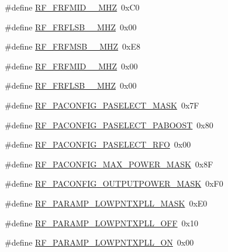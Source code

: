 \begin{DoxyCompactItemize}
\item 
\#define \mbox{\hyperlink{sx1276_regs-_fsk_8h_a5f486d2c3784ae62187f57030d347b17}{R\+F\+\_\+\+F\+R\+F\+M\+I\+D\+\_\+\_\+\+M\+HZ}}~0x\+C0
\item 
\#define \mbox{\hyperlink{sx1276_regs-_fsk_8h_aafaad9f6003901f9081b92d207c67022}{R\+F\+\_\+\+F\+R\+F\+L\+S\+B\+\_\+\_\+\+M\+HZ}}~0x00
\item 
\#define \mbox{\hyperlink{sx1276_regs-_fsk_8h_a61fa44af0eda546fb2dd7a2d1e772e9f}{R\+F\+\_\+\+F\+R\+F\+M\+S\+B\+\_\+\_\+\+M\+HZ}}~0x\+E8
\item 
\#define \mbox{\hyperlink{sx1276_regs-_fsk_8h_a0fe5c603e40a6d7c28902efeefc14049}{R\+F\+\_\+\+F\+R\+F\+M\+I\+D\+\_\+\_\+\+M\+HZ}}~0x00
\item 
\#define \mbox{\hyperlink{sx1276_regs-_fsk_8h_abedb5dbcb3f48722c93379c37eb7cdee}{R\+F\+\_\+\+F\+R\+F\+L\+S\+B\+\_\+\_\+\+M\+HZ}}~0x00
\item 
\#define \mbox{\hyperlink{sx1276_regs-_fsk_8h_a1f6faf51858096a4381e494bc157dedd}{R\+F\+\_\+\+P\+A\+C\+O\+N\+F\+I\+G\+\_\+\+P\+A\+S\+E\+L\+E\+C\+T\+\_\+\+M\+A\+SK}}~0x7F
\item 
\#define \mbox{\hyperlink{sx1276_regs-_fsk_8h_ae9a12e879be43e88ad7cff8f48010a9e}{R\+F\+\_\+\+P\+A\+C\+O\+N\+F\+I\+G\+\_\+\+P\+A\+S\+E\+L\+E\+C\+T\+\_\+\+P\+A\+B\+O\+O\+ST}}~0x80
\item 
\#define \mbox{\hyperlink{sx1276_regs-_fsk_8h_a01b86de3552e662d9994a1c4c4d8c571}{R\+F\+\_\+\+P\+A\+C\+O\+N\+F\+I\+G\+\_\+\+P\+A\+S\+E\+L\+E\+C\+T\+\_\+\+R\+FO}}~0x00
\item 
\#define \mbox{\hyperlink{sx1276_regs-_fsk_8h_aa89d945546b59e43c22a245423d58378}{R\+F\+\_\+\+P\+A\+C\+O\+N\+F\+I\+G\+\_\+\+M\+A\+X\+\_\+\+P\+O\+W\+E\+R\+\_\+\+M\+A\+SK}}~0x8F
\item 
\#define \mbox{\hyperlink{sx1276_regs-_fsk_8h_a88306565c0c75c9421326683fdcb84e8}{R\+F\+\_\+\+P\+A\+C\+O\+N\+F\+I\+G\+\_\+\+O\+U\+T\+P\+U\+T\+P\+O\+W\+E\+R\+\_\+\+M\+A\+SK}}~0x\+F0
\item 
\#define \mbox{\hyperlink{sx1276_regs-_fsk_8h_a4821994144ee566eb3452c92c08d1801}{R\+F\+\_\+\+P\+A\+R\+A\+M\+P\+\_\+\+L\+O\+W\+P\+N\+T\+X\+P\+L\+L\+\_\+\+M\+A\+SK}}~0x\+E0
\item 
\#define \mbox{\hyperlink{sx1276_regs-_fsk_8h_a6ee4b65572eec82ea7473695aa118762}{R\+F\+\_\+\+P\+A\+R\+A\+M\+P\+\_\+\+L\+O\+W\+P\+N\+T\+X\+P\+L\+L\+\_\+\+O\+FF}}~0x10
\item 
\#define \mbox{\hyperlink{sx1276_regs-_fsk_8h_ab08c5cb0f135bcc77cb0d238467ce7b6}{R\+F\+\_\+\+P\+A\+R\+A\+M\+P\+\_\+\+L\+O\+W\+P\+N\+T\+X\+P\+L\+L\+\_\+\+ON}}~0x00

\end{DoxyCompactItemize}
